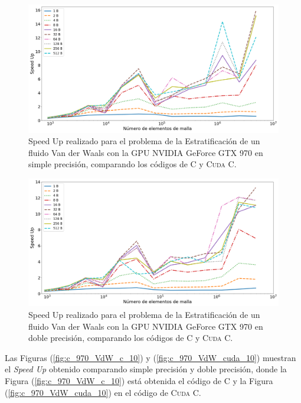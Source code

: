 \begin{figure}[htbp]
	\centering
	\includegraphics[width=\textwidth]{figs/cap4/s_970_VdW_simple_10}
	\caption{Speed Up realizado para el problema de la Estratificación de un fluido Van der Waals con la GPU NVIDIA GeForce GTX 970 en simple precisión, comparando los códigos de \textsc{C} y \textsc{Cuda C}.} 
	\label{fig:s_970_VdW_simple_10}	
\end{figure}

\begin{figure}[htbp]
	\centering
	\includegraphics[width=\textwidth]{figs/cap4/s_970_VdW_double_10}
	\caption{Speed Up realizado para el problema de la Estratificación de un fluido Van der Waals con la GPU NVIDIA GeForce GTX 970 en doble precisión, comparando los códigos de \textsc{C} y \textsc{Cuda C}.} 
	\label{fig:s_970_VdW_double_10}	
\end{figure}

\newpage

Las Figuras (\ref{fig:c_970_VdW_c_10}) y (\ref{fig:c_970_VdW_cuda_10}) muestran el \textit{Speed Up} obtenido comparando simple precisión y doble precisión, donde la Figura (\ref{fig:c_970_VdW_c_10}) está obtenida el código de \textsc{C} y la Figura (\ref{fig:c_970_VdW_cuda_10}) en el código de \textsc{Cuda C}. 

